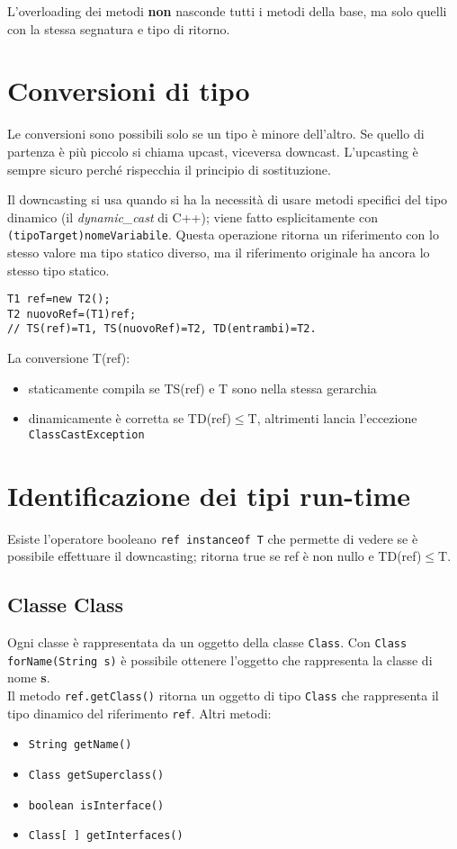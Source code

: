 L'overloading dei metodi \textbf{non} nasconde tutti i metodi della base, ma solo quelli con la stessa segnatura e tipo di ritorno.

\section{Conversioni di tipo} %
Le conversioni sono possibili solo se un tipo è minore dell'altro. Se quello di partenza è più piccolo si chiama upcast, viceversa downcast.
L'upcasting è sempre sicuro perché rispecchia il principio di sostituzione.

Il downcasting si usa quando si ha la necessità di usare metodi specifici del tipo dinamico (il \textit{dynamic\_cast} di C++); viene fatto esplicitamente con \texttt{(tipoTarget)nomeVariabile}. Questa operazione ritorna un riferimento con lo stesso valore ma tipo statico diverso, ma il riferimento originale ha ancora lo stesso tipo statico.
\begin{lstlisting}
T1 ref=new T2();
T2 nuovoRef=(T1)ref;
// TS(ref)=T1, TS(nuovoRef)=T2, TD(entrambi)=T2.
\end{lstlisting}
La conversione T(ref):
\begin{itemize}
\item  staticamente compila se TS(ref) e T sono nella stessa gerarchia
\item  dinamicamente è corretta se TD(ref)$\le$T, altrimenti lancia l'eccezione \texttt{ClassCastException}
\end{itemize}

\section{Identificazione dei tipi run-time} %
Esiste l'operatore booleano \texttt{ref instanceof T} che permette di vedere se è possibile effettuare il downcasting; ritorna true se ref è non nullo e TD(ref)$\le$T.

\subsection{Classe Class}
Ogni classe è rappresentata da un oggetto della classe \texttt{Class}. Con \texttt{Class forName(String s)} è possibile ottenere l'oggetto che rappresenta la classe di nome \textbf{s}. \\
Il metodo \texttt{ref.getClass()} ritorna un oggetto di tipo \texttt{Class} che rappresenta il tipo dinamico del riferimento \texttt{ref}.
Altri metodi:
\begin{itemize}
\item \texttt{String getName()}
\item \texttt{Class getSuperclass()}
\item \texttt{boolean isInterface()}
\item \texttt{Class[ ] getInterfaces()}
\end{itemize}

